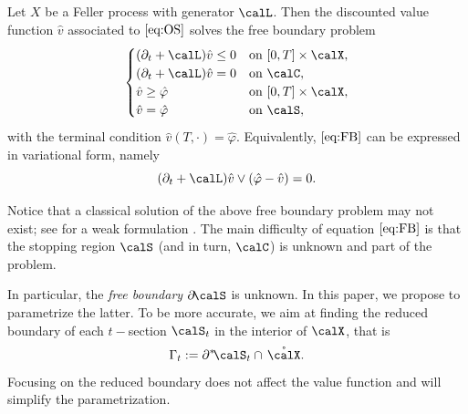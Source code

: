 \begin{theorem} Let $X$ be a Feller process with generator $\calL$. Then the discounted value function $\hat{v}$ associated to  $\eqref{eq:OS}$ solves the free boundary problem 
\begin{align}\label{eq:FB}
    \begin{cases}
    (\partial_t + \calL)\hat{v} \le 0 &  \text{on } [0,T] \times \calX,\\
    (\partial_t + \calL)\hat{v} = 0  & \text{on } \calC,\\
   \hat{v} \ge \hat{\varphi} & \text{on } [0,T] \times \calX,\\
    \hat{v}= \hat{\varphi}  & \text{on } \calS,
    \end{cases}
\end{align}
with  the terminal condition $\hat{v}(T,\cdot)= \hat{\varphi}$. Equivalently, $\eqref{eq:FB}$ can be expressed in variational form, namely 
$$ (\partial_t + \calL)\hat{v} \vee (\hat{\varphi} - \hat{v}) = 0.$$
\end{theorem}
Notice that a classical solution of the above free boundary problem  may not exist; see \citet{JLL} for a weak formulation . 
The main difficulty of equation $\eqref{eq:FB}$ is that the stopping region $\calS$ (and in turn, $\calC$) is unknown and  part of the problem. 

In particular, the \textit{free boundary} $\partial \!  \calS$ is unknown. In this paper, 
 we propose to parametrize the latter. To be more accurate, we aim at finding the  reduced  boundary of each $t-$section $\calS_t$ in the interior of $\calX$, that is  
 $$\Gamma_t := \partial^*\! \calS_t \cap \, \mathring{\calX}.$$
 Focusing on the reduced boundary does not affect the value function and will simplify the parametrization. 

